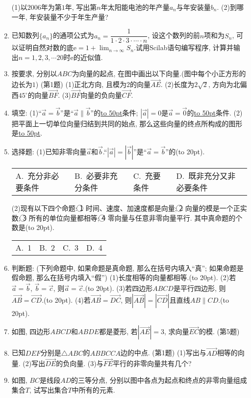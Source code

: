 \documentclass[10pt,a4paper]{article}
\newcommand{\blank}[1]{\underline{\hbox to #1pt{}}}
\newcommand{\bracket}[1]{(\hbox to #1pt{})}
\newcommand{\fourch}[4]{\par\begin{tabular}{p{.23\textwidth}p{.23\textwidth}p{.23\textwidth}p{.23\textwidth}}
A.~#1 &B.~#2& C.~#3& D.~#4
\end{tabular}}
\begin{document}
\begin{enumerate}[1.]
(1)以$2006$年为第$1$年, 写出第$n$年太阳能电池的年产量$a_n$与年安装量$b_n$.
(2)到哪一年, 年安装量不少于年生产量?
\item 已知数列$\{a_n\}$的通项公式为$a_n=\dfrac 1{1\cdot 2\cdot 3\cdot \cdots \cdot n}$, 设这个数列的前$n$项和为$S_n$, 可以证明自然对数的底$\mathrm{e}=1+\displaystyle\lim_{n\to\infty}S_n$.试用Scilab语句编写程序, 计算并输出$n=1,2,3,\cdots 20$时$\mathrm{e}$的近似值.
\item 按要求, 分别以$ABC$为向量的起点, 在图中画出以下向量.(图中每个小正方形的边长为$1$)
(第1题)
(1)正北方向, 且模为$2$的向量$\overrightarrow{AE}$.
(2)长度为$2\sqrt 2$, 方向为北偏西$45^{\circ }$的向量$\overrightarrow{BF}$.
(3)$\overrightarrow{BF}$向量的负向量$\overrightarrow{CF}$.
\item 填空:
(1)``$\overrightarrow a=\overrightarrow b$''是``$\overrightarrow a\parallel \overrightarrow b$''的\blank{50}条件; $|\overrightarrow a|=0$是$\overrightarrow a=\overrightarrow 0$的\blank{50}条件.
(2)把平面上一切单位向量归结到共同的始点, 那么这些向量的终点所构成的图形是\blank{50}.
\item 选择题:
(1)已知非零向量$\overrightarrow a$和$\overrightarrow b$.``$|\overrightarrow a|=|\overrightarrow b|$''是``$\overrightarrow a=\overrightarrow b$''的\bracket{20}.
\fourch{充分非必要条件}{必要非充分条件}{充要条件}{既非充分又非必要条件}
(2)现有以下四个命题:
\textcircled{1} 时间、速度、加速度都是向量;
\textcircled{2} 向量的模是一个正实数;
\textcircled{3} 所有的单位向量都相等;
\textcircled{4} 零向量与任意非零向量平行.
其中真命题的个数是\bracket{20}.
\fourch{1}{2}{3}{4}
\item 判断题: (下列命题中, 如果命题是真命题, 那么在括号内填入``真''; 如果命题是假命题, 那么在括号内填入``假'')
(1)长度相等的向量都相等.\bracket{20}.
(2)若$\overrightarrow a=\overrightarrow b$, $\overrightarrow b=\overrightarrow c$, 则$\overrightarrow a=\overrightarrow c$.\bracket{20}.
(3)若四边形$ABCD$是平行四边形, 则$\overrightarrow{AB}=\overrightarrow{CD}$.\bracket{20}.
(4)若$\overrightarrow{AB}=\overrightarrow{DC}$, 则$|\overrightarrow{AB}|=|\overrightarrow{CD}|$且直线$AB\parallel CD$.\bracket{20}.
\item 如图, 四边形$ABCD$和$ABDE$都是菱形, 若$|\overrightarrow{AE}|=3$, 求向量$\overrightarrow{EC}$的模.
(第5题)
\item 已知$DEF$分别是$\triangle ABC$的$ABBCCA$边的中点.
(第1题)
(1)写出与$\overrightarrow{AD}$相等的向量.
(2)写出$\overrightarrow{DE}$的负向量.
(3)与$\overrightarrow{FE}$平行的非零向量共有几个?
\item 如图, $BC$是线段$AD$的三等分点, 分别以图中各点为起点和终点的非零向量组成集合$T$, 试写出集合$T$中所有的元素.

\end{enumerate}
\end{document}
